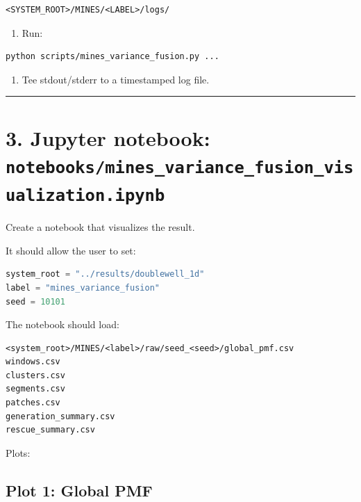 \documentclass[
  10.5pt,
]{article}
\providecommand{\tightlist}{%
  \setlength{\itemsep}{0pt}\setlength{\parskip}{0pt}}
\begin{document}
\begin{lstlisting}
<SYSTEM_ROOT>/MINES/<LABEL>/logs/
\end{lstlisting}

\begin{enumerate}
\def\labelenumi{\arabic{enumi}.}
\setcounter{enumi}{4}
\tightlist
\item
  Run:
\end{enumerate}

\begin{lstlisting}[language=bash]
python scripts/mines_variance_fusion.py ...
\end{lstlisting}

\begin{enumerate}
\def\labelenumi{\arabic{enumi}.}
\setcounter{enumi}{5}
\tightlist
\item
  Tee stdout/stderr to a timestamped log file.
\end{enumerate}

\begin{center}\rule{0.5\linewidth}{0.5pt}\end{center}

\section{\texorpdfstring{3. Jupyter notebook:
\texttt{notebooks/mines\_variance\_fusion\_visualization.ipynb}}{3. Jupyter notebook: notebooks/mines\_variance\_fusion\_visualization.ipynb}}\label{jupyter-notebook-notebooksmines_variance_fusion_visualization.ipynb}

Create a notebook that visualizes the result.

It should allow the user to set:

\begin{lstlisting}[language=Python]
system_root = "../results/doublewell_1d"
label = "mines_variance_fusion"
seed = 10101
\end{lstlisting}

The notebook should load:

\begin{lstlisting}
<system_root>/MINES/<label>/raw/seed_<seed>/global_pmf.csv
windows.csv
clusters.csv
segments.csv
patches.csv
generation_summary.csv
rescue_summary.csv
\end{lstlisting}

Plots:

\subsection{Plot 1: Global PMF}\label{plot-1-global-pmf}
\end{document}
